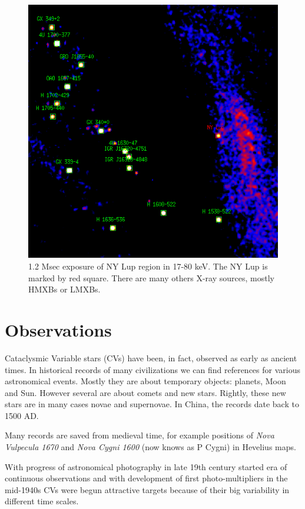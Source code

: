 \documentclass[oneside,a4paper,11pt]{report}
\begin{document}
\begin{figure}[!hbt]
\centering
\includegraphics[totalheight=12cm]{plot/ds9_3}
\caption{1.2 Msec exposure of NY Lup region in 17-80 keV. The NY Lup is marked by red square. There are many others X-ray sources,
mostly HMXBs or LMXBs.}
\label{nylup1} 
\end{figure}



\section{Observations}
Cataclysmic Variable stars (CVs) have been, in fact, observed as early as ancient times. In historical 
records of  many civilizations we can find references for various astronomical events. Mostly they are 
about temporary objects: planets, Moon and Sun. However several are about comets and new stars. Rightly, 
these new stars are in many cases novae and supernovae. In China, the records date back to 1500 AD. 

Many records are saved from medieval time, for example positions of \textit{Nova Vulpecula 1670} and 
\textit{Nova Cygni 1600} (now knows as P Cygni) in Hevelius maps. 

With progress of astronomical photography in late 19th century started era of continuous observations
and with  development of first photo-multipliers in the mid-1940s CVs were begun attractive 
targets because of their big variability in different time scales. 
\end{document}
